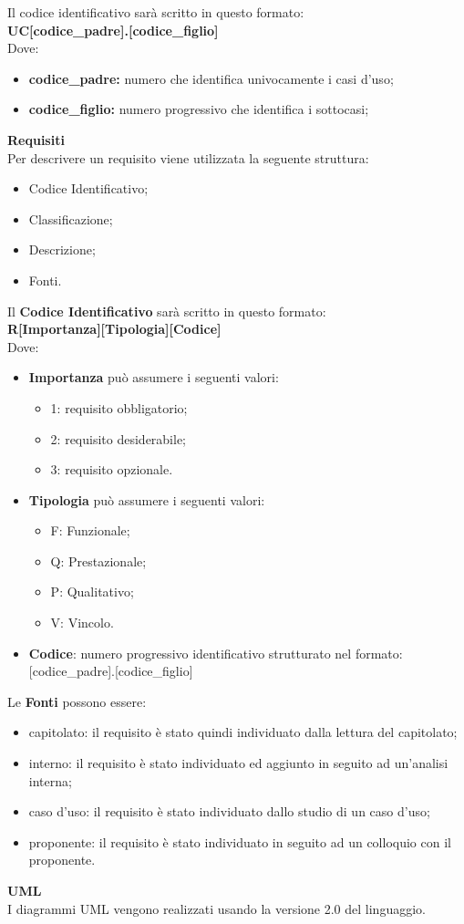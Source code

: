 Il codice identificativo sarà scritto in questo formato: \\
\textbf{UC[codice\_padre].[codice\_figlio]} \\
Dove:
\begin{itemize}
	\item \textbf{codice\_padre:} numero che identifica univocamente i casi d'uso;
	\item \textbf{codice\_figlio:} numero progressivo che identifica i sottocasi;
\end{itemize}
\textbf{Requisiti}\\
Per descrivere un requisito viene utilizzata la seguente struttura:
\begin{itemize}
	\item Codice Identificativo;
	\item Classificazione;
	\item Descrizione;
	\item Fonti.
\end{itemize} 
Il \textbf{Codice Identificativo} sarà scritto in questo formato: \\
\textbf{R[Importanza][Tipologia][Codice]} \\
Dove:
\begin{itemize}
	\item \textbf{Importanza} può assumere i seguenti valori:
	\begin{itemize}
		\item 1: requisito obbligatorio;
		\item 2: requisito desiderabile;
		\item 3: requisito opzionale.
	\end{itemize}
	\item \textbf{Tipologia} può assumere i seguenti valori:
	\begin{itemize}
		\item F: Funzionale;
		\item Q: Prestazionale;
		\item P: Qualitativo;
		\item V: Vincolo.
	\end{itemize}
	\item\textbf{Codice}: numero progressivo identificativo strutturato nel formato: [codice\_padre].[codice\_figlio]
\end{itemize}
Le \textbf{Fonti} possono essere:
\begin{itemize}
	\item capitolato: il requisito è stato quindi individuato dalla lettura del capitolato;
	\item interno: il requisito è stato individuato ed aggiunto in seguito ad un'analisi interna;
	\item caso d'uso: il requisito è stato individuato dallo studio di un caso d'uso;
	\item proponente: il requisito è stato individuato in seguito ad un colloquio con il proponente.
\end{itemize}
\textbf{UML} \\
I diagrammi UML vengono realizzati usando la versione 2.0 del linguaggio.
